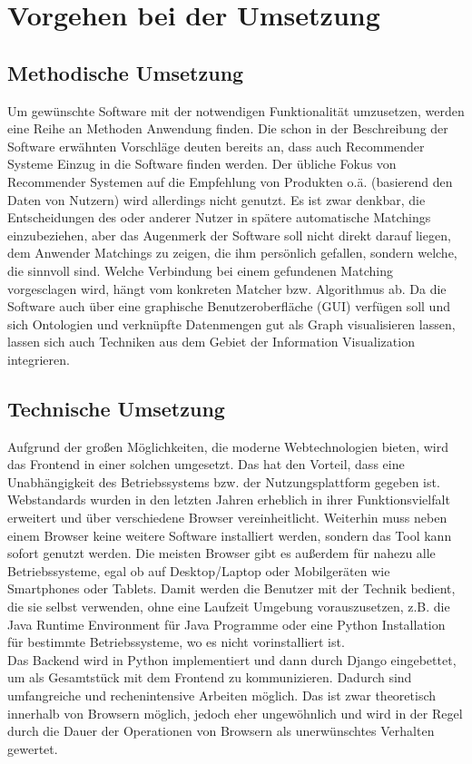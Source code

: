 \section{Vorgehen bei der Umsetzung}

\subsection{Methodische Umsetzung}
Um gewünschte Software mit der notwendigen Funktionalität umzusetzen, werden
eine Reihe an Methoden Anwendung finden. Die schon in der Beschreibung der
Software erwähnten Vorschläge deuten bereits an, dass auch Recommender Systeme
Einzug in die Software finden werden. Der übliche Fokus von Recommender Systemen
auf die Empfehlung von Produkten o.ä. (basierend den Daten von Nutzern) wird
allerdings nicht genutzt. Es ist zwar denkbar, die Entscheidungen des oder
anderer Nutzer in spätere automatische Matchings einzubeziehen, aber das
Augenmerk der Software soll nicht direkt darauf liegen, dem Anwender Matchings
zu zeigen, die ihm persönlich gefallen, sondern welche, die sinnvoll sind.
Welche Verbindung bei einem gefundenen Matching vorgesclagen wird, hängt vom
konkreten Matcher bzw. Algorithmus ab. Da die Software auch über eine graphische
Benutzeroberfläche (GUI) verfügen soll und sich Ontologien und verknüpfte
Datenmengen gut als Graph visualisieren lassen, lassen sich auch Techniken aus
dem Gebiet der Information Visualization integrieren.

\subsection{Technische Umsetzung}
Aufgrund der großen Möglichkeiten, die moderne Webtechnologien bieten, wird das
Frontend in einer solchen umgesetzt. Das hat den Vorteil, dass eine
Unabhängigkeit des Betriebssystems bzw. der Nutzungsplattform gegeben ist. Webstandards wurden in
den letzten Jahren erheblich in ihrer Funktionsvielfalt erweitert und über
verschiedene Browser vereinheitlicht. Weiterhin muss neben einem Browser keine
weitere Software installiert werden, sondern das Tool kann sofort genutzt
werden. Die meisten Browser gibt es außerdem für nahezu alle Betriebssysteme,
egal ob auf Desktop/Laptop oder Mobilgeräten wie Smartphones oder Tablets. Damit
werden die Benutzer mit der Technik bedient, die sie selbst verwenden, ohne
eine Laufzeit Umgebung vorauszusetzen, z.B. die Java Runtime Environment für
Java Programme oder eine Python Installation für bestimmte
Betriebssysteme, wo es nicht vorinstalliert ist.\\
Das Backend wird in Python implementiert und dann durch Django eingebettet, um
als Gesamtstück mit dem Frontend zu kommunizieren. Dadurch sind umfangreiche und
rechenintensive Arbeiten möglich. Das ist zwar theoretisch innerhalb von
Browsern möglich, jedoch eher ungewöhnlich und wird in der Regel durch die Dauer
der Operationen von Browsern als unerwünschtes Verhalten gewertet.

\pagebreak[4]